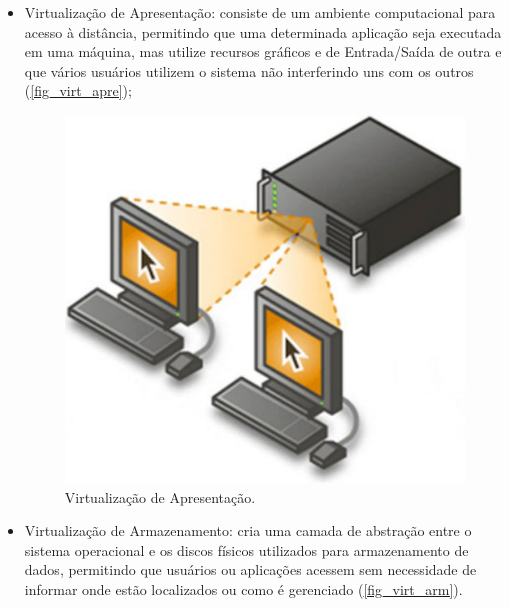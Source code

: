 \begin{itemize}
    \item Virtualização de Apresentação: consiste de um ambiente computacional para acesso à distância, permitindo que uma determinada aplicação seja executada em uma máquina, mas utilize recursos gráficos e de Entrada/Saída de outra e que vários usuários utilizem o sistema não interferindo uns com os outros (\autoref{fig_virt_apre});
    
    \begin{figure}[htb]
    	\caption{\label{fig_virt_apre}Virtualização de Apresentação.}
    	\begin{center}
    	    \includegraphics[scale=0.3]{imagens/virtualizacao-apresentacao.jpg}
    	\end{center}
    \end{figure}
    
    \item Virtualização de Armazenamento: cria uma camada de abstração entre o sistema operacional e os discos físicos utilizados para armazenamento de dados, permitindo que usuários ou aplicações acessem sem necessidade de informar onde estão localizados ou como é gerenciado (\autoref{fig_virt_arm}).
    

\end{itemize}
